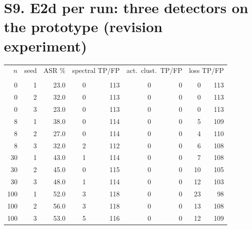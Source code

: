 \documentclass[10pt,a4paper]{article}
\begin{document}
\section{S9. E2d per run: three detectors on the prototype (revision experiment)}
\small\begin{longtable}{rrrrrrrrr}\toprule $n$ & seed & ASR \% & \multicolumn{2}{c}{spectral TP/FP} & \multicolumn{2}{c}{act.\ clust.\ TP/FP} & \multicolumn{2}{c}{loss TP/FP}\\\\\midrule
0 & 1 & 23.0 & 0 & 113 & 0 & 0 & 0 & 113\\
0 & 2 & 32.0 & 0 & 113 & 0 & 0 & 0 & 113\\
0 & 3 & 23.0 & 0 & 113 & 0 & 0 & 0 & 113\\
8 & 1 & 38.0 & 0 & 114 & 0 & 0 & 5 & 109\\
8 & 2 & 27.0 & 0 & 114 & 0 & 0 & 4 & 110\\
8 & 3 & 32.0 & 2 & 112 & 0 & 0 & 6 & 108\\
30 & 1 & 43.0 & 1 & 114 & 0 & 0 & 7 & 108\\
30 & 2 & 45.0 & 0 & 115 & 0 & 0 & 10 & 105\\
30 & 3 & 48.0 & 1 & 114 & 0 & 0 & 12 & 103\\
100 & 1 & 52.0 & 3 & 118 & 0 & 0 & 23 & 98\\
100 & 2 & 56.0 & 3 & 118 & 0 & 0 & 13 & 108\\
100 & 3 & 53.0 & 5 & 116 & 0 & 0 & 12 & 109\\
\bottomrule\end{longtable}\normalsize
\end{document}
